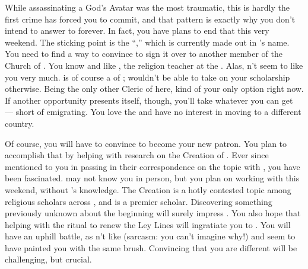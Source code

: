 \documentclass[char]{GL2020}
\begin{document}
While assassinating a God's Avatar was the most traumatic, this is hardly the first crime \cAntiChup{} has forced you to commit, and that pattern is exactly why you don't intend to answer to \cAntiChup{} forever. In fact, you have plans to end that this very weekend. The sticking point is the ``\iScholarship{},'' which is currently made out in \cAntiChup{}'s name. You need to find a way to convince \cAntiChup{} to sign it over to another member of the Church of \cTechGod{}. You know and like \cBeetle{\full}, the religion teacher at the \pSc{}. Alas, \cBeetle{\they} \cBeetle{\do}n't seem to like you very much. \cBeetle{} is of course a \cBeetle{\cleric} of \cTechGod{}; \cBeetle{\they} wouldn't be able to take on your scholarship otherwise. Being the only other Cleric of \cTechGod{} here, \cBeetle{\they} \cBeetle{\are} kind of your only option right now. If another opportunity presents itself, though, you'll take whatever you can get — short of emigrating. You love the \pTech{} and have no interest in moving to a different country. 

Of course, you will have to convince \cBeetle{} to become your new patron. You plan to accomplish that by helping \cEbbPriest{\full} with \cEbbPriest{\their} research on the Creation of \pEarth{}. Ever since \cAntiChup{} mentioned to you in passing in their correspondence on the topic with \cEbbPriest{}, you have been fascinated. \cEbbPriest{} may not know you in person, but you plan on working with \cEbbPriest{\them} this weekend, without \cAntiChup{}’s knowledge. The Creation is a hotly contested topic among religious scholars across \pEarth{}, and \cBeetle{} is a premier scholar. Discovering something previously unknown about the beginning will surely impress \cBeetle{\them}. You also hope that helping with the ritual to renew the Ley Lines will ingratiate you to \cBeetle{}. You will have an uphill battle, as \cBeetle{\they} \cBeetle{\do}n't like \cAntiChup{} (sarcasm: you can't imagine why!) and seem\cBeetle{\verbs} to have painted you with the same brush. Convincing \cBeetle{\them} that you are different will be challenging, but crucial.
\end{document}
